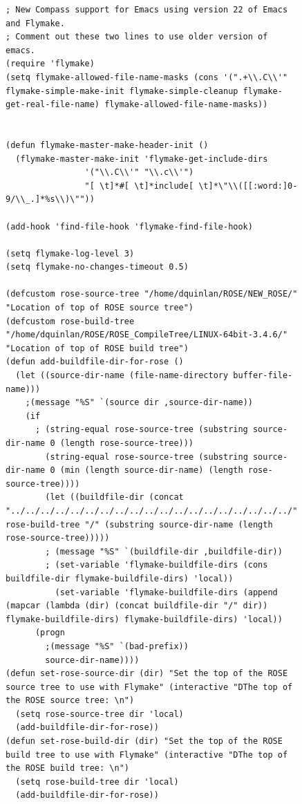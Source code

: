 \begin{figure}
{\scriptsize
\begin{verbatim}
; New Compass support for Emacs using version 22 of Emacs and Flymake.
; Comment out these two lines to use older version of emacs.
(require 'flymake)
(setq flymake-allowed-file-name-masks (cons '(".+\\.C\\'" flymake-simple-make-init flymake-simple-cleanup flymake-get-real-file-name) flymake-allowed-file-name-masks))


(defun flymake-master-make-header-init ()
  (flymake-master-make-init 'flymake-get-include-dirs
			    '("\\.C\\'" "\\.c\\'")
			    "[ \t]*#[ \t]*include[ \t]*\"\\([[:word:]0-9/\\_.]*%s\\)\""))

(add-hook 'find-file-hook 'flymake-find-file-hook)

(setq flymake-log-level 3)
(setq flymake-no-changes-timeout 0.5)

(defcustom rose-source-tree "/home/dquinlan/ROSE/NEW_ROSE/" "Location of top of ROSE source tree")
(defcustom rose-build-tree "/home/dquinlan/ROSE/ROSE_CompileTree/LINUX-64bit-3.4.6/" "Location of top of ROSE build tree")
(defun add-buildfile-dir-for-rose ()
  (let ((source-dir-name (file-name-directory buffer-file-name)))
    ;(message "%S" `(source dir ,source-dir-name))
    (if
      ; (string-equal rose-source-tree (substring source-dir-name 0 (length rose-source-tree)))
        (string-equal rose-source-tree (substring source-dir-name 0 (min (length source-dir-name) (length rose-source-tree))))
        (let ((buildfile-dir (concat "../../../../../../../../../../../../../../../../../../../" rose-build-tree "/" (substring source-dir-name (length rose-source-tree)))))
        ; (message "%S" `(buildfile-dir ,buildfile-dir))
        ; (set-variable 'flymake-buildfile-dirs (cons buildfile-dir flymake-buildfile-dirs) 'local))
          (set-variable 'flymake-buildfile-dirs (append (mapcar (lambda (dir) (concat buildfile-dir "/" dir)) flymake-buildfile-dirs) flymake-buildfile-dirs) 'local))
      (progn
        ;(message "%S" `(bad-prefix))
        source-dir-name))))
(defun set-rose-source-dir (dir) "Set the top of the ROSE source tree to use with Flymake" (interactive "DThe top of the ROSE source tree: \n")
  (setq rose-source-tree dir 'local)
  (add-buildfile-dir-for-rose))
(defun set-rose-build-dir (dir) "Set the top of the ROSE build tree to use with Flymake" (interactive "DThe top of the ROSE build tree: \n")
  (setq rose-build-tree dir 'local)
  (add-buildfile-dir-for-rose))


\end{verbatim}}
\end{figure}

